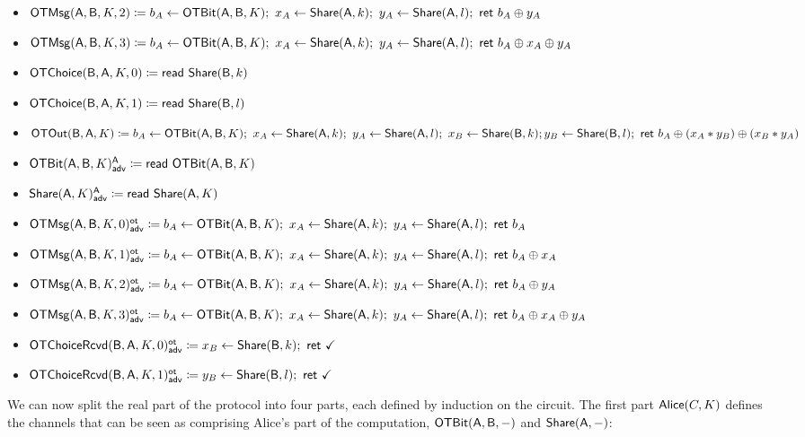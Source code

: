 \begin{itemize}
\begin{itemize}
\item $\OTMsg(\A,\B,K,2) \coloneqq b_A \leftarrow \OTBit(\A,\B,K); \ x_A \leftarrow \Share(\A,k); \ y_A \leftarrow \Share(\A,l); \ \ret{b_A \oplus y_A}$
\item $\OTMsg(\A,\B,K,3) \coloneqq b_A \leftarrow \OTBit(\A,\B,K); \ x_A \leftarrow \Share(\A,k); \ y_A \leftarrow \Share(\A,l); \ \ret{b_A \oplus x_A \oplus y_A}$\smallskip
\item $\OTChoice(\B,\A,K,0) \coloneqq \read{\Share(\B,k)}$
\item $\OTChoice(\B,\A,K,1) \coloneqq \read{\Share(\B,l)}$\smallskip
\item $\OTOut(\B,\A,K) \coloneqq b_A \leftarrow \OTBit(\A,\B,K); \ x_A \leftarrow \Share(\A,k); \ y_A \leftarrow \Share(\A,l); \ x_B \leftarrow \Share(\B,k); \\ y_B \leftarrow \\ \Share(\B,l); \ \ret{b_A \oplus (x_A * y_B) \oplus (x_B * y_A)}$\medskip
\item {\color{blue} $\LeakOTBit(\A,\B,K)^\A_\adv \coloneqq \read{\OTBit(\A,\B,K)}$}
\item {\color{blue} $\LeakShare(\A,K)^\A_\adv \coloneqq \read{\Share(\A,K)}$}\medskip
\item {\color{blue} $\LeakOTMsg(\A,\B,K,0)^\ot_\adv \coloneqq b_A \leftarrow \OTBit(\A,\B,K); \ x_A \leftarrow \Share(\A,k); \ y_A \leftarrow \Share(\A,l); \ \ret{b_A}$}
\item {\color{blue} $\LeakOTMsg(\A,\B,K,1)^\ot_\adv \coloneqq b_A \leftarrow \OTBit(\A,\B,K); \ x_A \leftarrow \Share(\A,k); \ y_A \leftarrow \Share(\A,l); \ \ret{b_A \oplus x_A}$}
\item {\color{blue} $\LeakOTMsg(\A,\B,K,2)^\ot_\adv \coloneqq b_A \leftarrow \OTBit(\A,\B,K); \ x_A \leftarrow \Share(\A,k); \ y_A \leftarrow \Share(\A,l); \ \ret{b_A \oplus y_A}$}
\item {\color{blue} $\LeakOTMsg(\A,\B,K,3)^\ot_\adv \coloneqq b_A \leftarrow \OTBit(\A,\B,K); \ x_A \leftarrow \Share(\A,k); \ y_A \leftarrow \Share(\A,l); \ \ret{b_A \oplus x_A \oplus y_A}$}\medskip
\item {\color{blue} $\LeakOTChoiceRcvd(\B,\A,K,0)^\ot_\adv \coloneqq x_B \leftarrow \Share(\B,k); \ \ret{\checkmark}$}
\item {\color{blue} $\LeakOTChoiceRcvd(\B,\A,K,1)^\ot_\adv \coloneqq y_B \leftarrow \Share(\B,l); \ \ret{\checkmark}$}
\end{itemize}
\end{itemize}

\noindent We can now split the real part of the protocol into four parts, each defined by induction on the circuit. The first part $\Alice(C,K)$ defines the channels that can be seen as comprising Alice's part of the computation, $\OTBit(\A,\B,-)$ and $\Share(\A,-)$:

